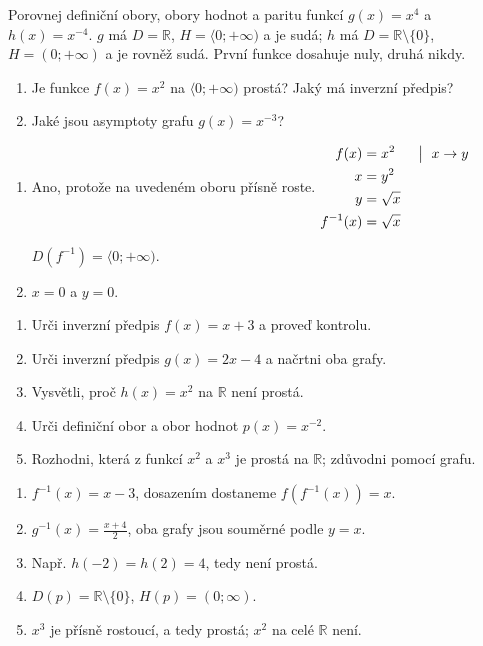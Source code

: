 \documentclass[11pt,a4paper]{article}
\begin{document}
\begin{prikladReseniBox}[title={Příklad 2}]
Porovnej definiční obory, obory hodnot a paritu funkcí $g(x)=x^4$ a $h(x)=x^{-4}$.
\tcblower
$g$ má $D=\mathbb R$, $H=\langle0;+\infty)$ a je sudá; $h$ má $D=\mathbb R\setminus\{0\}$, $H=(0;+\infty)$ a je rovněž sudá. První funkce dosahuje nuly, druhá nikdy.
\end{prikladReseniBox}

\begin{zadaniReseniBox}[title={Samostatná práce 1}]
\begin{enumerate}[label=\alph*)]
\item Je funkce $f(x)=x^2$ na $\langle0;+\infty)$ prostá? Jaký má inverzní předpis?
\item Jaké jsou asymptoty grafu $g(x)=x^{-3}$?
\end{enumerate}
\tcblower
\begin{enumerate}[label=\alph*)]
\item Ano, protože na uvedeném oboru přísně roste.
\(\displaystyle\begin{aligned}f(x)&=x^2 &&\bigm|\ x\to y\\x&=y^2\\y&=\sqrt{x}\\f^{-1}(x)&=\sqrt{x}\end{aligned}\)

$D(f^{-1})=\langle0;+\infty)$.
\item $x=0$ a $y=0$.
\end{enumerate}
\end{zadaniReseniBox}


\begin{zadaniReseniBox}[title={Domácí úkol}]
\begin{enumerate}[label=\alph*)]
\item Urči inverzní předpis $f(x)=x+3$ a proveď kontrolu.
\item Urči inverzní předpis $g(x)=2x-4$ a načrtni oba grafy.
\item Vysvětli, proč $h(x)=x^2$ na $\mathbb R$ není prostá.
\item Urči definiční obor a obor hodnot $p(x)=x^{-2}$.
\item Rozhodni, která z funkcí $x^2$ a $x^3$ je prostá na $\mathbb R$; zdůvodni pomocí grafu.
\end{enumerate}
\tcblower
\begin{enumerate}[label=\alph*)]
\item $f^{-1}(x)=x-3$, dosazením dostaneme $f(f^{-1}(x))=x$.
\item $g^{-1}(x)=\frac{x+4}{2}$, oba grafy jsou souměrné podle $y=x$.
\item Např. $h(-2)=h(2)=4$, tedy není prostá.
\item $D(p)=\mathbb R\setminus\{0\}$, $H(p)=(0;\infty)$.
\item $x^3$ je přísně rostoucí, a tedy prostá; $x^2$ na celé $\mathbb R$ není.
\end{enumerate}
\end{zadaniReseniBox}
\end{document}
